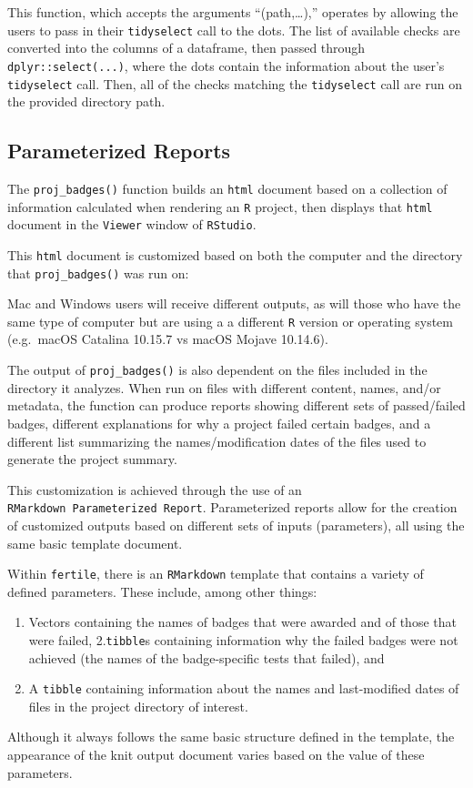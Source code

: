 \documentclass[12pt,twoside]{reedthesis}
\providecommand{\tightlist}{%
  \setlength{\itemsep}{0pt}\setlength{\parskip}{0pt}}
\begin{document}
This function, which accepts the arguments ``(path,\ldots{}),'' operates
by allowing the users to pass in their \texttt{tidyselect} call to the
dots. The list of available checks are converted into the columns of a
dataframe, then passed through \texttt{dplyr::select(...)}, where the
dots contain the information about the user's \texttt{tidyselect} call.
Then, all of the checks matching the \texttt{tidyselect} call are run on
the provided directory path.

\subsection{Parameterized Reports}\label{parameterized-reports}

The \texttt{proj\_badges()} function builds an \texttt{html} document
based on a collection of information calculated when rendering an
\texttt{R} project, then displays that \texttt{html} document in the
\texttt{Viewer} window of \texttt{RStudio}.

This \texttt{html} document is customized based on both the computer and
the directory that \texttt{proj\_badges()} was run on:

Mac and Windows users will receive different outputs, as will those who
have the same type of computer but are using a a different \texttt{R}
version or operating system (e.g.~macOS Catalina 10.15.7 vs macOS Mojave
10.14.6).

The output of \texttt{proj\_badges()} is also dependent on the files
included in the directory it analyzes. When run on files with different
content, names, and/or metadata, the function can produce reports
showing different sets of passed/failed badges, different explanations
for why a project failed certain badges, and a different list
summarizing the names/modification dates of the files used to generate
the project summary.

This customization is achieved through the use of an
\texttt{RMarkdown\ Parameterized\ Report}. Parameterized reports allow
for the creation of customized outputs based on different sets of inputs
(parameters), all using the same basic template document.

Within \texttt{fertile}, there is an \texttt{RMarkdown} template that
contains a variety of defined parameters. These include, among other
things:
\begin{enumerate}
\def\labelenumi{\arabic{enumi}.}
\tightlist
\item
  Vectors containing the names of badges that were awarded and of those
  that were failed, 2.\texttt{tibble}s containing information why the
  failed badges were not achieved (the names of the badge-specific tests
  that failed), and
\item
  A \texttt{tibble} containing information about the names and
  last-modified dates of files in the project directory of interest.
\end{enumerate}
Although it always follows the same basic structure defined in the
template, the appearance of the knit output document varies based on the
value of these parameters.
\end{document}
